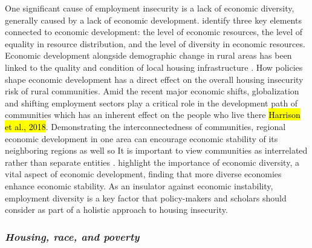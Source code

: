 One significant cause of employment insecurity is a lack of economic diversity, generally caused by a lack of economic development. \citet{sherrieb_measuring_2010} identify three key elements connected to economic development: the level of economic resources, the level of equality in resource distribution, and the level of diversity in economic resources. Economic development alongside demographic change in rural areas has been linked to the quality and condition of local housing infrastructure \citep{barcus_heterogeneity_2011}. How policies shape economic development has a direct effect on the overall housing insecurity risk of rural communities. Amid the recent major economic shifts, globalization and shifting employment sectors play a critical role in the development path of communities which has an inherent effect on the people who live there \hl{Harrison et al., 2018}. Demonstrating the interconnectedness of communities, regional economic development in one area can encourage economic stability of its neighboring regions as well so It is important to view communities as interrelated rather than separate entities \citep{chen_economic_2018}. \citet{deller_spatial_2016} highlight the importance of economic diversity, a vital aspect of economic development, finding that more diverse economies enhance economic stability. As an insulator against economic instability, employment diversity is a key factor that policy-makers and scholars should consider as part of a holistic approach to housing insecurity. 

\subsubsection{\textit{Housing, race, and poverty}}

